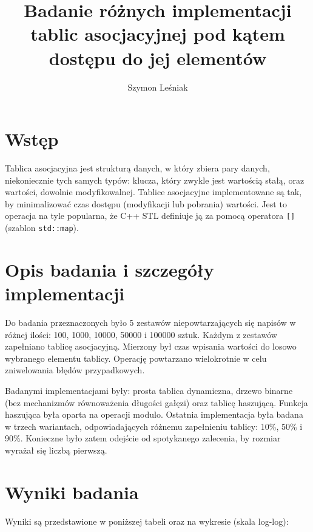 \documentclass[a4paper,10pt]{article}
\title{Badanie różnych implementacji tablic asocjacyjnej pod kątem dostępu
do jej elementów}
\author{Szymon Leśniak}
\begin{document}
\maketitle

\section{Wstęp}

\par Tablica asocjacyjna jest strukturą danych, w który zbiera pary danych, 
niekoniecznie tych samych typów: klucza, który zwykle jest wartością stałą, 
oraz wartości, dowolnie modyfikowalnej. Tablice asocjacyjne implementowane
są tak, by minimalizować czas dostępu (modyfikacji lub pobrania) wartości.
Jest to operacja na tyle popularna, że C++ STL definiuje ją za pomocą operatora
\verb+[]+ (szablon \verb+std::map+). 

\section{Opis badania i szczegóły implementacji}

\par Do badania przeznaczonych było 5 zestawów niepowtarzających się napisów
w różnej ilości: 100, 1000, 10000, 50000 i 100000 sztuk. Każdym z zestawów
zapełniano tablicę asocjacyjną. Mierzony był czas wpisania wartości do losowo
wybranego elementu tablicy. Operację powtarzano wielokrotnie w celu zniwelowania
błędów przypadkowych.

\par Badanymi implementacjami były: prosta tablica dynamiczna, drzewo binarne 
(bez mechanizmów równoważenia długości gałęzi) oraz tablicę haszującą. Funkcja
haszująca była oparta na operacji modulo. Ostatnia implementacja była badana w 
trzech wariantach, odpowiadających różnemu zapełnieniu tablicy: 10\%, 50\% i
90\%. Konieczne było zatem odejście od spotykanego zalecenia, by rozmiar 
wyrażał się liczbą pierwszą.

\section{Wyniki badania}

\par Wyniki są przedstawione w poniższej tabeli oraz na wykresie (skala 
log-log):
\end{document}
